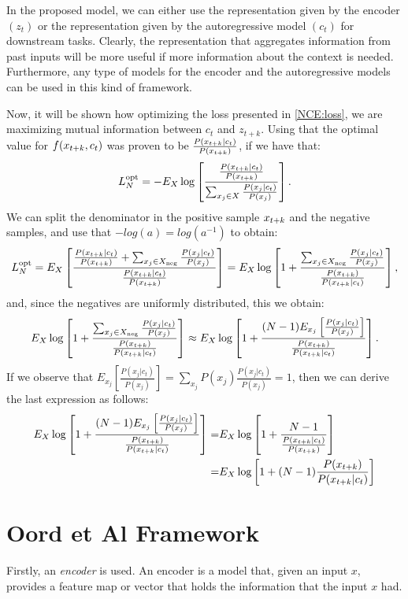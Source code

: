 In the proposed model, we can either use the representation given by the encoder $(z_t)$ or the representation given by the autoregressive model $(c_t)$ for downstream tasks. Clearly, the representation that aggregates information from past inputs will be more useful
if more information about the context is needed. Furthermore, any type of models for the encoder and the autoregressive models can be used in this kind of framework.

Now, it will be shown how optimizing the loss presented in \ref{NCE:loss}, we are maximizing mutual information between $c_t$ and $z_{t+k}$. Using that the optimal value for $f(x_{t+k},c_t)$ was proven to be $\frac{P(x_{t+k}|c_t)}{P(x_{t+k})}$, if we have that:
\[
L_N^{\operatorname{opt}} = - E_X \log \left[ \frac{\frac{P(x_{t+k}|c_t)}{P(x_{t+k})}}{ \sum_{x_j \in X} \frac{P(x_{j}|c_t)}{P(x_{j})}} \right].
\]
We can split the denominator in the positive sample $x_{t+k}$ and the negative samples, and use that $-log(a) = log(a^{-1})$ to obtain:
\[
L_N^{\operatorname{opt}} = E_X \left[\frac{ \frac{P(x_{t+k}|c_t)}{P(x_{t+k})} + \sum_{x_j \in X_{\operatorname{neg}}} \frac{P(x_j|c_t)}{P(x_j)}  } {\frac{P(x_{t+k}|c_t)}{P(x_{t+k})} } \right] = E_X \log \left[ 1+ \frac{\sum_{x_j \in X_{\operatorname{neg}}}\frac{P(x_j|c_t)}{P(x_j)}}{\frac{P(x_{t+k})}{P(x_{t+k}|c_t)}} \right],
\]
and, since the negatives are uniformly distributed, this we obtain:
\[
E_X \log \left[ 1+ \frac { \sum_{x_j \in X_{\operatorname{neg}}} \frac{P(x_j|c_t)}{P(x_j)}} {\frac{P(x_{t+k})}{P(x_{t+k}|c_t)}} \right] \approx E_X \log \left[ 1+ \frac{ (N-1) E_{x_j}  \left[ \frac{P(x_j|c_t)}{P(x_j)}\right]}{\frac{P(x_{t+k})}{P(x_{t+k}|c_t)}} \right].
\]
If we observe that $E_{x_j} \left[ \frac{P(x_j|c_t)}{P(x_j)} \right] = \sum_{x_j} P(x_j) \frac{P(x_j|c_t)}{P(x_j)} = 1$, then we can derive the last expression as follows:
\begin{align*}
E_X \log \left[ 1+ \frac{ (N-1) E_{x_j}  \left[ \frac{P(x_j|c_t)}{P(x_j)}\right]}{\frac{P(x_{t+k})}{P(x_{t+k}|c_t)}} \right] =  & E_X \log \left[ 1 + \frac{N-1}{ \frac{P(x_{t+k}|c_t)}{P(x_{t+k})}}\right]\\
 = & E_X \log \left[ 1+ (N-1)\frac{P(x_{t+k})}{P(x_{t+k}|c_t)}\right]
\end{align*}


\section{Oord et Al Framework}


Firstly, an \emph{encoder} is used. An encoder is a model that, given an input $x$, provides a feature map or vector that holds the information
that the input $x$ had.

